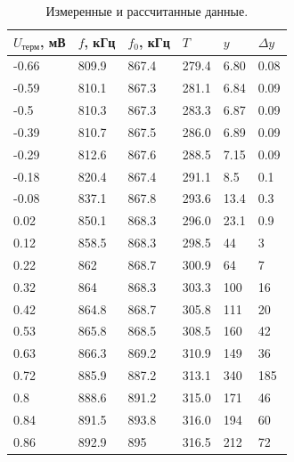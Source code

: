 \documentclass[a4paper,12pt]{article} %
\begin{document}
\begin{table}[]
\centering
\begin{tabular}{|l|l|l|l|l|l|}
\hline
$U_\text{терм}$, мВ & $f$, кГц & $f_0$, кГц & $T$   & $y$  & $\Delta y$ \\ \hline
-0.66               & 809.9    & 867.4      & 279.4 & 6.80 & 0.08       \\ \hline
-0.59               & 810.1    & 867.3      & 281.1 & 6.84 & 0.09       \\ \hline
-0.5                & 810.3    & 867.3      & 283.3 & 6.87 & 0.09       \\ \hline
-0.39               & 810.7    & 867.5      & 286.0 & 6.89 & 0.09       \\ \hline
-0.29               & 812.6    & 867.6      & 288.5 & 7.15 & 0.09       \\ \hline
-0.18               & 820.4    & 867.4      & 291.1 & 8.5  & 0.1        \\ \hline
-0.08               & 837.1    & 867.8      & 293.6 & 13.4 & 0.3        \\ \hline
0.02                & 850.1    & 868.3      & 296.0 & 23.1 & 0.9        \\ \hline
0.12                & 858.5    & 868.3      & 298.5 & 44   & 3          \\ \hline
0.22                & 862      & 868.7      & 300.9 & 64   & 7          \\ \hline
0.32                & 864      & 868.3      & 303.3 & 100  & 16         \\ \hline
0.42                & 864.8    & 868.7      & 305.8 & 111  & 20         \\ \hline
0.53                & 865.8    & 868.5      & 308.5 & 160  & 42         \\ \hline
0.63                & 866.3    & 869.2      & 310.9 & 149  & 36         \\ \hline
0.72                & 885.9    & 887.2      & 313.1 & 340  & 185        \\ \hline
0.8                 & 888.6    & 891.2      & 315.0 & 171  & 46         \\ \hline
0.84                & 891.5    & 893.8      & 316.0 & 194  & 60         \\ \hline
0.86                & 892.9    & 895        & 316.5 & 212  & 72         \\ \hline
\end{tabular}
\caption{Измеренные и рассчитанные данные.}
\label{tab:data}
\end{table}
\end{document}
